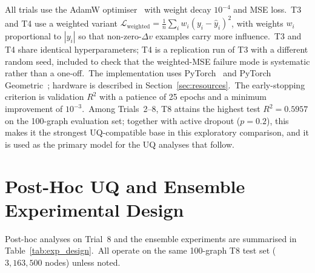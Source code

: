 All trials use the AdamW optimiser~\cite{loshchilov2019decoupled} with weight decay $10^{-4}$ and MSE loss.\ T3 and T4 use a weighted variant $\mathcal{L}_\text{weighted} = \tfrac{1}{n}\sum_i w_i(y_i - \hat y_i)^2$, with weights $w_i$ proportional to $|y_i|$ so that non-zero-$\Delta v$ examples carry more influence.\ T3 and T4 share identical hyperparameters; T4 is a replication run of T3 with a different random seed, included to check that the weighted-MSE failure mode is systematic rather than a one-off.\ The implementation uses PyTorch~\cite{paszke2019pytorch} and PyTorch Geometric~\cite{fey2019fast}; hardware is described in Section~\ref{sec:resources}.\ The early-stopping criterion is validation $R^2$ with a patience of 25 epochs and a minimum improvement of $10^{-3}$.\ Among Trials~2--8, T8 attains the highest test $R^2 = 0.5957$ on the 100-graph evaluation set; together with active dropout ($p = 0.2$), this makes it the strongest UQ-compatible base in this exploratory comparison, and it is used as the primary model for the UQ analyses that follow.

\section{Post-Hoc UQ and Ensemble Experimental Design}\label{sec:uq_design}

Post-hoc analyses on Trial~8 and the ensemble experiments are summarised in Table~\ref{tab:exp_design}.\ All operate on the same 100-graph T8 test set ($3{,}163{,}500$ nodes) unless noted.

